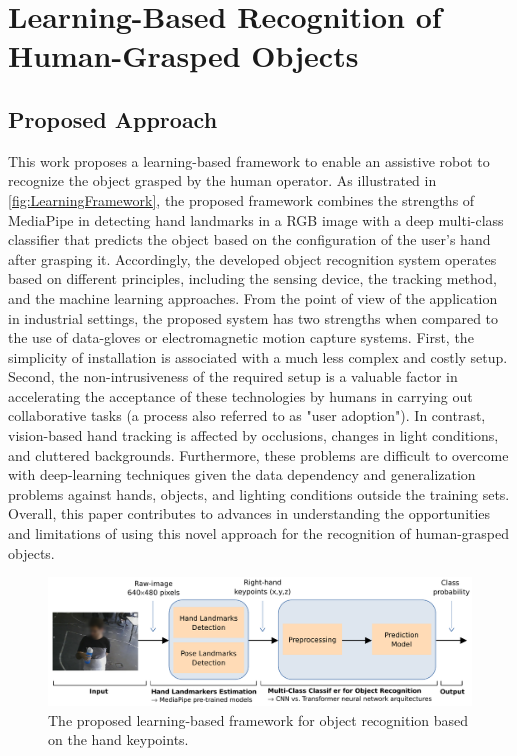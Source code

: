 \section{Learning-Based Recognition of Human-Grasped Objects}

\subsection{Proposed Approach}
\label{subsection:proposal_overview}

This work proposes a learning-based framework to enable an assistive robot to recognize the object grasped by the human operator. As illustrated in \autoref{fig:LearningFramework}, the proposed framework combines the strengths of MediaPipe in detecting hand landmarks in a RGB image with a deep multi-class classifier that predicts the object based on the configuration of the user’s hand after grasping it. Accordingly, the developed object recognition system operates based on different principles, including the sensing device, the tracking method, and the machine learning approaches. From the point of view of the application in industrial settings, the proposed system has two strengths when compared to the use of data-gloves or electromagnetic motion capture systems. First, the simplicity of installation is associated with a much less complex and costly setup. Second, the non-intrusiveness of the required setup is a valuable factor in accelerating the acceptance of these technologies by humans in carrying out collaborative tasks (a process also referred to as "user adoption"). In contrast, vision-based hand tracking is affected by occlusions, changes in light conditions, and cluttered backgrounds. Furthermore, these problems are difficult to overcome with deep-learning techniques given the data dependency and generalization problems against hands, objects, and lighting conditions outside the training sets. Overall, this paper contributes to advances in understanding the opportunities and limitations of using this novel approach for the recognition of human-grasped objects.

\begin{figure}[ht]
    \centering
    \includegraphics[width=1\columnwidth]{figs/LearningFrameworkB.pdf}
    \caption{The proposed learning-based framework for object recognition based on the hand keypoints.}
    \label{fig:LearningFramework}
\end{figure}

